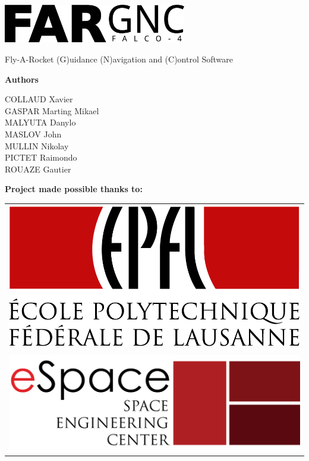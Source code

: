 \documentclass[twoside]{book}
\newlength{\logolength}
\begin{document}
\hypersetup{pageanchor=false}
\begin{titlepage}

\begin{center}%

\vspace{2cm}

\includegraphics[width=0.6\textwidth]{../../doc/images/Logo_large.png}

\vspace*{1cm}

{\Large Fly-A-Rocket (G)uidance (N)avigation and (C)ontrol Software }\\
\vspace*{1cm}

\textbf{Authors}

COLLAUD Xavier\\
GASPAR Marting Mikael\\
MALYUTA Danylo\\
MASLOV John\\
MULLIN Nikolay\\
PICTET Raimondo\\
ROUAZE Gautier

\vspace{1cm}

\textbf{Project made possible thanks to:}

\vspace{0.3cm}

\def\arraystretch{1.5}
\begin{tabular}{m{\logolength}}
	\includegraphics[width=\logolength]{../../doc/images/EPFL.png} \\
	\\
	\includegraphics[width=\logolength]{../../doc/images/eSpace.jpg} \\
\end{tabular}


\end{center}
\end{titlepage}
\end{document}
